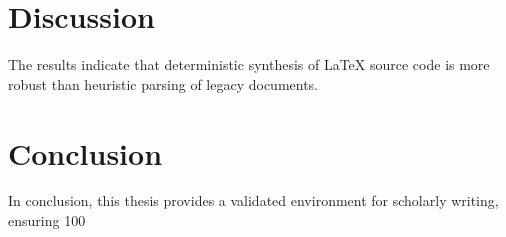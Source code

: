 \documentclass{thesis}
\begin{document}
\section{Discussion}
The results indicate that deterministic synthesis of LaTeX source code is more robust than heuristic parsing of legacy documents.

\section{Conclusion}
In conclusion, this thesis provides a validated environment for scholarly writing, ensuring 100%



\end{document}
